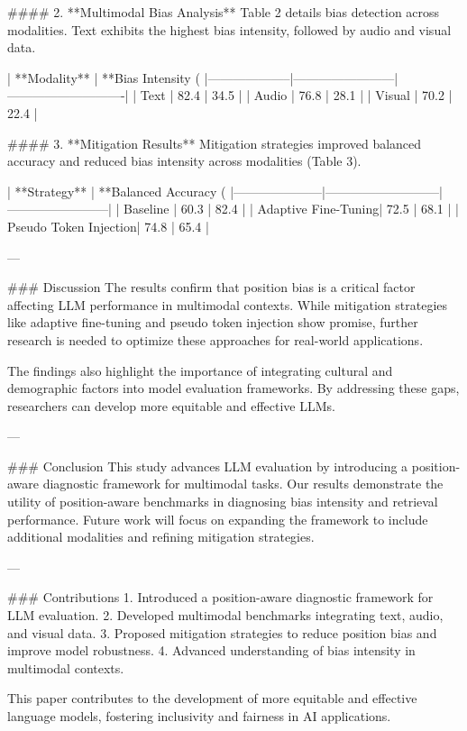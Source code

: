 #### 2. **Multimodal Bias Analysis**  
Table 2 details bias detection across modalities. Text exhibits the highest bias intensity, followed by audio and visual data.

| **Modality**       | **Bias Intensity (%
|--------------------|------------------------|----------------------------|  
| Text              | 82.4                  | 34.5                       |  
| Audio             | 76.8                  | 28.1                       |  
| Visual            | 70.2                  | 22.4                       |  

#### 3. **Mitigation Results**  
Mitigation strategies improved balanced accuracy and reduced bias intensity across modalities (Table 3).

| **Strategy**        | **Balanced Accuracy (%
|---------------------|---------------------------|------------------------|  
| Baseline           | 60.3                     | 82.4                  |  
| Adaptive Fine-Tuning| 72.5                     | 68.1                  |  
| Pseudo Token Injection| 74.8                  | 65.4                  |  

---

### Discussion  
The results confirm that position bias is a critical factor affecting LLM performance in multimodal contexts. While mitigation strategies like adaptive fine-tuning and pseudo token injection show promise, further research is needed to optimize these approaches for real-world applications.

The findings also highlight the importance of integrating cultural and demographic factors into model evaluation frameworks. By addressing these gaps, researchers can develop more equitable and effective LLMs.

---

### Conclusion  
This study advances LLM evaluation by introducing a position-aware diagnostic framework for multimodal tasks. Our results demonstrate the utility of position-aware benchmarks in diagnosing bias intensity and retrieval performance. Future work will focus on expanding the framework to include additional modalities and refining mitigation strategies.

---

### Contributions  
1. Introduced a position-aware diagnostic framework for LLM evaluation.  
2. Developed multimodal benchmarks integrating text, audio, and visual data.  
3. Proposed mitigation strategies to reduce position bias and improve model robustness.  
4. Advanced understanding of bias intensity in multimodal contexts.  

This paper contributes to the development of more equitable and effective language models, fostering inclusivity and fairness in AI applications.
